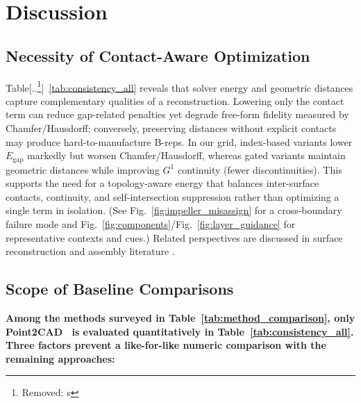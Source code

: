 \documentclass{ieeeaccess}
\providecommand{\DIFaddtex}[1]{{\color{blue}\bfseries #1}} %
\providecommand{\DIFdeltex}[1]{{\color{red}[..\footnote{\color{black}Removed: #1}]}} %
\providecommand{\DIFaddbegin}{} %
\providecommand{\DIFdelbegin}{} %
\providecommand{\DIFdelend}{} %
\providecommand{\DIFadd}[1]{\texorpdfstring{\DIFaddtex{#1}}{#1}} %
\providecommand{\DIFdel}[1]{\texorpdfstring{\DIFdeltex{#1}}{}} %
\begin{document}
\section{Discussion}
\label{sec:discussion}

\subsection{Necessity of Contact-Aware Optimization}
Table\DIFdelbegin \DIFdel{s}\DIFdelend  ~\ref{tab:consistency_all} reveals that solver energy and geometric
distances capture complementary qualities of a reconstruction.
Lowering only the contact term can reduce gap-related penalties
yet degrade free-form fidelity measured by Chamfer/Hausdorff;
conversely, preserving distances without explicit contacts may
produce hard-to-manufacture B-reps. In our grid, index-based
variants lower $E_{\text{gap}}$ markedly but worsen Chamfer/Hausdorff,
whereas gated variants maintain geometric distances while
improving $G^1$ continuity (fewer discontinuities). This supports
the need for a topology-aware energy that balances inter-surface
contacts, continuity, and self-intersection suppression rather than
optimizing a single term in isolation. (See Fig.~\ref{fig:impeller_misassign}
for a cross-boundary failure mode and Fig.~\ref{fig:components}/Fig.~\ref{fig:layer_guidance}
for representative contexts and cues.) Related perspectives are discussed in surface reconstruction and assembly literature \cite{b13,b14,b22}.

\DIFaddbegin \subsection{\DIFadd{Scope of Baseline Comparisons}}
\DIFadd{Among the methods surveyed in Table~\ref{tab:method_comparison}, only
Point2CAD~\cite{b2} is evaluated quantitatively in
Table~\ref{tab:consistency_all}. Three factors prevent a like-for-like
numeric comparison with the remaining approaches:
}
\end{document}
